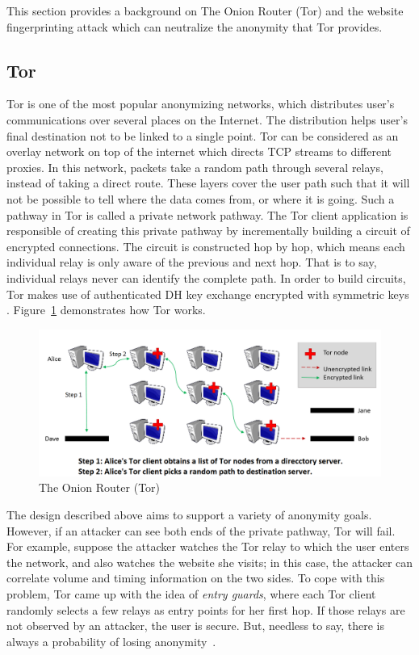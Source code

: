 
This section provides a background on The Onion Router (Tor) and the website fingerprinting attack which can neutralize the anonymity that Tor provides.

\subsection{Tor}

Tor is one of the most popular anonymizing networks, which distributes user's communications over several places on the Internet.
The distribution helps user's final destination not to be linked to a single point. Tor can be considered as an overlay network on top of the internet which directs TCP streams to different proxies.
In this network, packets take a random path through several relays, instead of taking a direct route.
These layers cover the user path such that it will not be possible to tell where the data comes from, or where it is going.
Such a pathway in Tor is called a private network pathway.
The Tor client application is responsible of creating this private pathway by incrementally building a circuit of encrypted connections.
The circuit is constructed hop by hop, which means each individual relay is only aware of the previous and next hop.
That is to say, individual relays never can identify the complete path. In order to build circuits, Tor makes use of authenticated DH key exchange encrypted with symmetric keys \cite{TorPage, dingledine2004tor}. Figure~\ref{fig:tor} demonstrates how Tor works.


\begin{figure}[h]
\includegraphics[width=1\columnwidth]{figures/tor.png}
\centering
\caption{The Onion Router (Tor)~\cite{TorPage}}
\label{fig:tor}
\end{figure}


The design described above aims to support a variety of anonymity goals. However, if an attacker can see both ends of the private pathway, Tor will fail.
For example, suppose the attacker watches the Tor relay to which the user enters the network, and also watches the website she visits; in this case, the attacker can correlate volume and timing information on the two sides.
To cope with this problem, Tor came up with the idea of {\it entry guards}, where each Tor client randomly selects a few relays as entry points for her first hop.
If those relays are not observed by an attacker, the user is secure.
But, needless to say, there is always a probability of losing anonymity~\cite{TorPage}.

